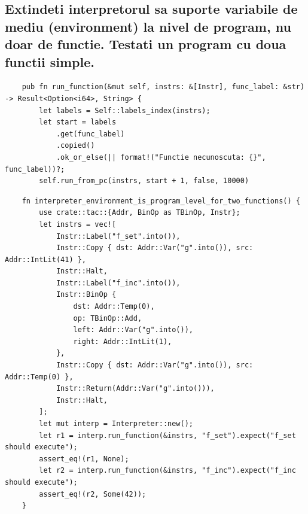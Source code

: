 \documentclass[11pt]{article}
\begin{document}
\subsection{Extindeti interpretorul sa suporte variabile de mediu (environment) la nivel de program, nu doar de functie. Testati un program cu doua functii simple.}
\label{sec:orgfa3d80d}
\begin{verbatim}
    pub fn run_function(&mut self, instrs: &[Instr], func_label: &str) -> Result<Option<i64>, String> {
        let labels = Self::labels_index(instrs);
        let start = labels
            .get(func_label)
            .copied()
            .ok_or_else(|| format!("Functie necunoscuta: {}", func_label))?;
        self.run_from_pc(instrs, start + 1, false, 10000)
\end{verbatim}
\begin{verbatim}
    fn interpreter_environment_is_program_level_for_two_functions() {
        use crate::tac::{Addr, BinOp as TBinOp, Instr};
        let instrs = vec![
            Instr::Label("f_set".into()),
            Instr::Copy { dst: Addr::Var("g".into()), src: Addr::IntLit(41) },
            Instr::Halt,
            Instr::Label("f_inc".into()),
            Instr::BinOp {
                dst: Addr::Temp(0),
                op: TBinOp::Add,
                left: Addr::Var("g".into()),
                right: Addr::IntLit(1),
            },
            Instr::Copy { dst: Addr::Var("g".into()), src: Addr::Temp(0) },
            Instr::Return(Addr::Var("g".into())),
            Instr::Halt,
        ];
        let mut interp = Interpreter::new();
        let r1 = interp.run_function(&instrs, "f_set").expect("f_set should execute");
        assert_eq!(r1, None);
        let r2 = interp.run_function(&instrs, "f_inc").expect("f_inc should execute");
        assert_eq!(r2, Some(42));
    }
\end{verbatim}
\end{document}
